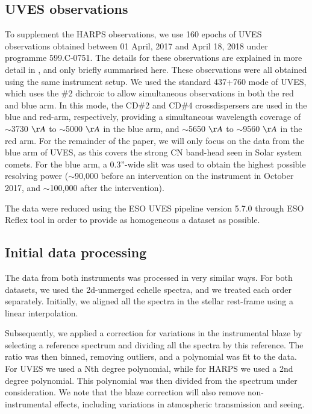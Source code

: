 \documentclass{aa}
\begin{document}
\subsection{UVES observations}
To supplement the HARPS observations, we use 160 epochs of UVES observations obtained between 01 April, 2017 and April 18, 2018 under programme 599.C-0751. The details for these observations are explained in more detail in \cite{vansluijs2019}, and only briefly summarised here. These observations were all obtained using the same instrument setup. We used the standard 437+760 mode of UVES, which uses the \#2 dichroic to allow simultaneous observations in both the red and blue arm. In this mode, the CD\#2 and CD\#4 crossdispersers are used in the blue and red-arm, respectively, providing a simultaneous wavelength coverage of $\sim$3730 $\AA$  to $\sim$5000 $\AA$ in the blue arm, and $\sim$5650 $\AA$ to $\sim$9560 $\AA$ in the red arm. For the remainder of the paper, we will only focus on the data from the blue arm of UVES, as this covers the strong CN band-head seen in Solar system comets. 
For the blue arm, a 0.3''-wide slit was used to obtain the highest possible resolving power ($\sim$90,000 before an intervention on the instrument in October 2017, and $\sim$100,000 after the intervention). 

The data were reduced using the ESO UVES pipeline version 5.7.0 through ESO Reflex tool in order to provide as homogeneous a dataset as possible. 

\subsection{Initial data processing}
The data from both instruments was processed in very similar ways. For both datasets, we used the 2d-unmerged echelle spectra, and we treated each order separately. Initially, we aligned all the spectra in the stellar rest-frame using a linear interpolation. 

Subsequently, we applied a correction for variations in the instrumental blaze by selecting a reference spectrum and dividing all the spectra by this reference. The ratio was then binned, removing outliers, and a polynomial was fit to the data. For UVES we used a Nth degree polynomial, while for HARPS we used a 2nd degree polynomial. This polynomial was then divided from the spectrum under consideration. We note that the blaze correction will also remove non-instrumental effects, including variations in atmospheric transmission and seeing.
\end{document}
